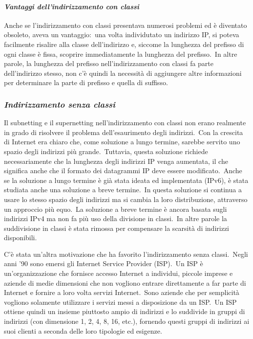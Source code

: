 \paragraph{\emph{Vantaggi dell'indirizzamento con classi}}

Anche se l'indirizzamento con classi presentava numerosi problemi ed è diventato obsoleto, aveva un vantaggio:\ una volta individutato un indirizzo IP, si poteva facilmente risalire alla classe dell'indirizzo e, siccome la lunghezza del prefisso di ogni classe è fissa, scoprire immediatamente la lunghezza del prefisso.\
In altre parole, la lunghezza del prefisso nell'indirizzamento con classi fa parte dell'indirizzo stesso, non c'è quindi la necessità di aggiungere altre informazioni per determinare la parte di prefisso e quella di suffisso.

\subsubsection{\emph{Indirizzamento senza classi}}

Il subnetting e il supernetting nell'indirizzamento con classi non erano realmente in grado di risolvere il problema dell'esaurimento degli indirizzi.\
Con la crescita di Internet era chiaro che, come soluzione a lungo termine, sarebbe servito uno spazio degli indirizzi più grande.\
Tuttavia, questa soluzione richiede necessariamente che la lunghezza degli indirizzi IP venga aumentata, il che significa anche che il formato dei datagrammi IP deve essere modificato.\
Anche se la soluzione a lungo termine è già stata ideata ed implementata (IPv6), è stata studiata anche una soluzione a breve termine.\
In questa soluzione si continua a usare lo stesso spazio degli indirizzi ma si cambia la loro distribuzione, attraverso un approccio più equo.\
La soluzione a breve termine è ancora basata sugli indirizzi IPv4 ma non fa più uso della divisione in classi.\
In altre parole la suddivisione in classi è stata rimossa per compensare la scarsità di indirizzi disponibili.

C'è stata un'altra motivazione che ha favorito l'indirizzamento senza classi.\
Negli anni '90 sono emersi gli Internet Service Provider (ISP).\
Un ISP è un'organizzazione che fornisce accesso Internet a individui, piccole imprese e aziende di medie dimensioni che non vogliono entrare direttamente a far parte di Internet e fornire a loro volta servizi Internet.\
Sono aziende che per semplicità vogliono solamente utilizzare i servizi messi a disposizione da un ISP.\
Un ISP ottiene quindi un insieme piuttosto ampio di indirizzi e lo suddivide in gruppi di indirizzi (con dimensione 1, 2, 4, 8, 16, etc.), fornendo questi gruppi di indirizzi ai suoi clienti a seconda delle loro tipologie ed esigenze.

